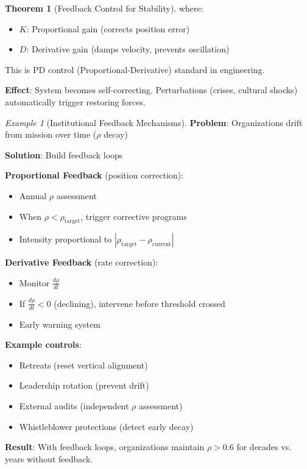 \documentclass[11pt,a4paper]{article}
\theoremstyle{definition}
\newtheorem{theorem}{Theorem}[section]
\theoremstyle{remark}
\newtheorem{example}{Example}[section]
\begin{document}
\begin{enumerate}
\begin{theorem}[Feedback Control for Stability]
where:
\begin{itemize}
    \item \(K\): Proportional gain (corrects position error)
    \item \(D\): Derivative gain (damps velocity, prevents oscillation)
\end{itemize}

This is PD control (Proportional-Derivative) standard in engineering.

\textbf{Effect}: System becomes self-correcting. Perturbations (crises, cultural shocks) automatically trigger restoring forces.
\end{theorem}

\begin{example}[Institutional Feedback Mechanisms]
\textbf{Problem}: Organizations drift from mission over time (\(\rho\) decay)

\textbf{Solution}: Build feedback loops

\textbf{Proportional Feedback} (position correction):
\begin{itemize}
    \item Annual \(\rho\) assessment
    \item When \(\rho < \rho_{\text{target}}\), trigger corrective programs
    \item Intensity proportional to \(|\rho_{\text{target}} - \rho_{\text{current}}|\)
\end{itemize}

\textbf{Derivative Feedback} (rate correction):
\begin{itemize}
    \item Monitor \(\frac{d\rho}{dt}\)
    \item If \(\frac{d\rho}{dt} < 0\) (declining), intervene before threshold crossed
    \item Early warning system
\end{itemize}

\textbf{Example controls}:
\begin{itemize}
    \item Retreats (reset vertical alignment)
    \item Leadership rotation (prevent drift)
    \item External audits (independent \(\rho\) assessment)
    \item Whistleblower protections (detect early decay)
\end{itemize}

\textbf{Result}: With feedback loops, organizations maintain \(\rho > 0.6\) for decades vs. years without feedback.
\end{example}


\end{enumerate}
\end{document}
